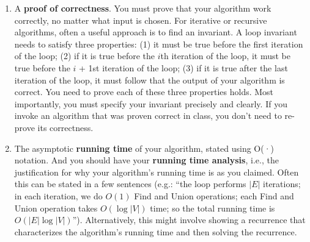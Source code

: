 \documentclass{article}
\begin{document}
\begin{enumerate}
	\item A {\textbf{proof of correctness}}.  You must prove that your algorithm work correctly, no matter
	      what input is chosen.
	      For iterative or recursive algorithms, often a useful approach is to find an invariant. A loop
	      invariant needs to satisfy three properties: (1) it must be true before the first iteration of the
	      loop; (2) if it is true before the $i$th iteration of the loop, it must be true before the $i$ + 1st
	      iteration of the loop; (3) if it is true after the last iteration of the loop, it must follow that the output of your algorithm is correct. You need to prove each of these three properties holds.
	      Most importantly, you must specify your invariant precisely and clearly.
	      If you invoke an algorithm that was proven correct in class, you don’t need to re-prove its correctness.

	\item The asymptotic \textbf{running time} of your algorithm, stated using O(·) notation. And you should have your \textbf{running time analysis}, i.e., the justification for why your algorithm’s running time is
	      as you claimed. Often this can be stated in a few sentences (e.g.: “the loop performs $|E|$
	      iterations; in each iteration, we do $O(1)$ Find and Union operations; each Find and Union
	      operation takes $O(\log|V|)$ time; so the total running time is $O(|E|\log|V|)$”). Alternatively, this
	      might involve showing a recurrence that characterizes the algorithm’s running time and then
	      solving the recurrence.
\end{enumerate}
\pagebreak
\end{document}
